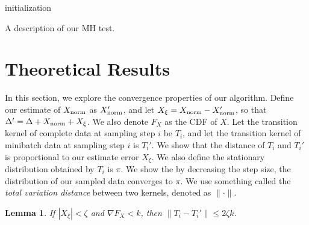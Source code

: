 \documentclass{article}
\newtheorem{lemma}{Lemma}
\begin{document}
\begin{algorithm}[t]
 initialization\;
\caption{A description of our MH test.}
\label{alg:our_algorithm}
\end{algorithm}




\section{Theoretical Results}\label{sec:theory}

In this section, we explore the convergence properties of our algorithm.  Define our estimate of
$X_{\rm norm}$ as $X_{\rm norm}'$, and let $X_{\xi} = X_{\rm norm} - X_{\rm norm}'$, so that
$\Delta' = \Delta + X_{\rm norm} + X_\xi$.  We also denote $F_X$ as the CDF of $X$.  Let the
transition kernel of complete data at sampling step $i$ be $T_i$, and let the transition kernel of
minibatch data at sampling step $i$ is $T_i'$.  We show that the distance of $T_i$ and $T_i'$ is
proportional to our estimate error $X_{\xi}$. We also define the stationary distribution obtained
by $T_i$ is $\pi$.  We show the by decreasing the step size, the distribution of our sampled data
converges to $\pi$. We use something called the \emph{total variation distance} between two kernels,
denoted as $\| \cdot \|$.

\begin{lemma}
If $|X_\xi| < \zeta$ and $\nabla F_X < k$, then $\|T_i-T_i'\| \le 2\zeta k$.
\end{lemma}
\end{document}
